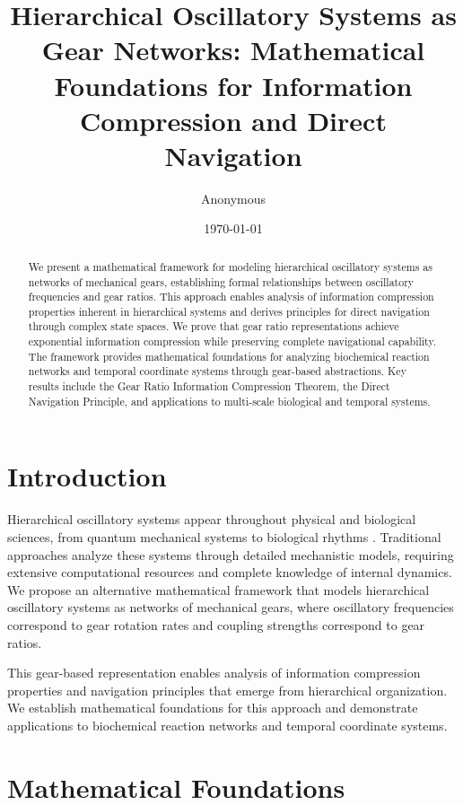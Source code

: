 \documentclass[11pt]{article}
\title{Hierarchical Oscillatory Systems as Gear Networks: Mathematical Foundations for Information Compression and Direct Navigation}
\author{Anonymous}
\date{\today}
\theoremstyle{remark}
\begin{document}
\maketitle

\begin{abstract}
We present a mathematical framework for modeling hierarchical oscillatory systems as networks of mechanical gears, establishing formal relationships between oscillatory frequencies and gear ratios. This approach enables analysis of information compression properties inherent in hierarchical systems and derives principles for direct navigation through complex state spaces. We prove that gear ratio representations achieve exponential information compression while preserving complete navigational capability. The framework provides mathematical foundations for analyzing biochemical reaction networks and temporal coordinate systems through gear-based abstractions. Key results include the Gear Ratio Information Compression Theorem, the Direct Navigation Principle, and applications to multi-scale biological and temporal systems.
\end{abstract}

\section{Introduction}

Hierarchical oscillatory systems appear throughout physical and biological sciences, from quantum mechanical systems \cite{dirac1958quantum} to biological rhythms \cite{glass2001biological}. Traditional approaches analyze these systems through detailed mechanistic models, requiring extensive computational resources and complete knowledge of internal dynamics. We propose an alternative mathematical framework that models hierarchical oscillatory systems as networks of mechanical gears, where oscillatory frequencies correspond to gear rotation rates and coupling strengths correspond to gear ratios.

This gear-based representation enables analysis of information compression properties and navigation principles that emerge from hierarchical organization. We establish mathematical foundations for this approach and demonstrate applications to biochemical reaction networks and temporal coordinate systems.

\section{Mathematical Foundations}
\end{document}
